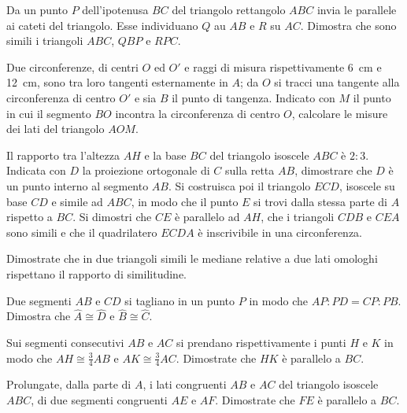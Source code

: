 \begin{multicols}{2}
\begin{esercizio}
\label{ese:6.71}
Da un punto $P$ dell'ipotenusa $BC$ del triangolo rettangolo $ABC$ invia le parallele ai cateti del triangolo. Esse individuano $Q$ au $AB$ e $R$ su $AC$. Dimostra che sono simili i triangoli $ABC$, $QBP$ e $RPC$.
\end{esercizio}

\begin{esercizio}
\label{ese:6.72}
Due circonferenze, di centri $O$ ed $O'$ e raggi di misura rispettivamente 6~cm e 12~cm, sono tra loro tangenti esternamente in $A$; da $O$ si tracci una tangente alla circonferenza di centro $O'$ e sia $B$ il punto di tangenza. Indicato con $M$ il punto in cui il segmento $BO$ incontra la circonferenza di centro $O$, calcolare le misure dei lati del triangolo $AOM$.
\end{esercizio}

\begin{esercizio}
\label{ese:6.73}
Il rapporto tra l'altezza $AH$ e la base $BC$ del triangolo isoscele $ABC$ è $2:3$. Indicata con $D$ la proiezione ortogonale di $C$ sulla retta $AB$, dimostrare che $D$ è un punto interno al segmento $AB$. Si costruisca poi il triangolo $ECD$, isoscele su base $CD$ e simile ad $ABC$, in modo che il punto $E$ si trovi dalla stessa parte di $A$ rispetto a $BC$. Si dimostri che $CE$ è parallelo ad $AH$, che i triangoli $CDB$ e $CEA$ sono simili e che il quadrilatero $ECDA$ è inscrivibile in una circonferenza.
\end{esercizio}

\begin{esercizio}
\label{ese:6.74}
Dimostrate che in due triangoli simili le mediane relative a due lati omologhi rispettano il rapporto di similitudine.
\end{esercizio}

\begin{esercizio}
\label{ese:6.75}
Due segmenti $AB$ e $CD$ si tagliano in un punto $P$ in modo che $AP:PD=CP:PB$. Dimostra che $\widehat{A}\cong \widehat{D}$ e $\widehat{B}\cong \widehat{C}$.
\end{esercizio}

\begin{esercizio}
\label{ese:6.76}
Sui segmenti consecutivi $AB$ e $AC$ si prendano rispettivamente i punti $H$ e $K$ in modo che $AH\cong \frac{3}{4}AB$ e $AK\cong \frac{3}{4}AC$. Dimostrate che $HK$ è parallelo a $BC$.
\end{esercizio}

\begin{esercizio}
\label{ese:6.77}
Prolungate, dalla parte di $A$, i lati congruenti $AB$ e $AC$ del triangolo isoscele $ABC$, di due segmenti congruenti $AE$ e $AF$. Dimostrate che $FE$ è parallelo a $BC$.
\end{esercizio}


\end{multicols}
